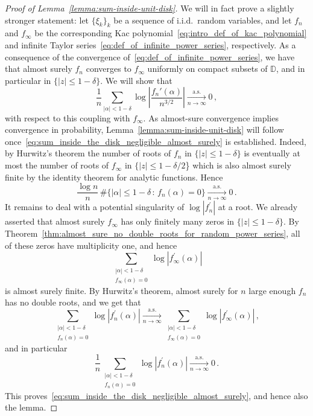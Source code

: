 \documentclass[11pt]{amsart}
\theoremstyle{remark}
\theoremstyle{definition}
\newcommand{\bD}{\mathbb D}
\begin{document}
    \begin{proof}[Proof of Lemma~\ref{lemma:sum-inside-unit-disk}]
        We will in fact prove a slightly stronger statement: let $\{\xi_k\}_k$ be a sequence of i.i.d.\ random variables, and let $f_n$ and $f_\infty$ be the corresponding Kac polynomial~\eqref{eq:intro_def_of_kac_polynomial} and infinite Taylor series~\eqref{eq:def_of_infinite_power_series}, respectively. As a consequence of the convergence of~\eqref{eq:def_of_infinite_power_series}, we have that almost surely $f_n$ converges to $f_\infty$ uniformly on compact subsets of $\bD$, and in particular in $\{|z|\le 1-\delta\}$. We will show that
        \begin{equation}
        \label{eq:sum_inside_the_disk_negligible_almost_surely}
            \frac{1}{n} \sum_{|\alpha| < 1- \delta} \log \left| \frac{f_n'(\alpha)}{n^{3/2}}\right| \xrightarrow[n\to\infty]{\text{a.s.}} 0 \, ,
        \end{equation}
        with respect to this coupling with $f_\infty$. As almost-sure convergence implies convergence in probability, Lemma~\ref{lemma:sum-inside-unit-disk} will follow once~\eqref{eq:sum_inside_the_disk_negligible_almost_surely} is established. Indeed,  by Hurwitz's theorem the number of roots of $f_n$ in $\{|z|\le 1-\delta\}$ is eventually at most the number of roots of $f_\infty$ in $\{|z| \leq 1 - \delta/2$\} which is also almost surely finite by the identity theorem for analytic functions. Hence
        \[
        \frac{\log n}{n} \,  \# \big\{ |\alpha|\le 1-\delta \, :\, f_n(\alpha) =0\big\} \xrightarrow[n\to\infty]{\text{a.s.}} 0 \, .
        \]
     It remains to deal with a potential singularity of $\log|f_n^\prime|$ at a root. We already asserted that almost surely $f_\infty$ has only finitely many zeros in $\{|z|\le 1-\delta\}$. By Theorem~\ref{thm:almost_sure_no_double_roots_for_random_power_series}, all of these zeros have multiplicity one, and hence
     \[
     \sum_{\substack{|\alpha| < 1- \delta \\ f_\infty(\alpha)=0}} \log | f_\infty^\prime(\alpha)|
     \]
     is almost surely finite. By Hurwitz's theorem, almost surely for $n$ large enough $f_n$ has no double roots, and we get that
     \[
     \sum_{\substack{|\alpha| < 1- \delta \\ f_n(\alpha)=0}} \log | f_n^\prime(\alpha)| \xrightarrow[n\to\infty]{\text{a.s.}}  \sum_{\substack{|\alpha| < 1- \delta \\ f_\infty(\alpha)=0}} \log | f_\infty^\prime(\alpha)|\, , 
     \]
     and in particular
     \[
     \frac{1}{n}\sum_{\substack{|\alpha| < 1- \delta \\ f_n(\alpha)=0}} \log | f_n^\prime(\alpha)| \xrightarrow[n\to\infty]{\text{a.s.}} 0 \, .
     \]
     This proves~\eqref{eq:sum_inside_the_disk_negligible_almost_surely}, and hence also the lemma.  
    \end{proof}
\end{document}
